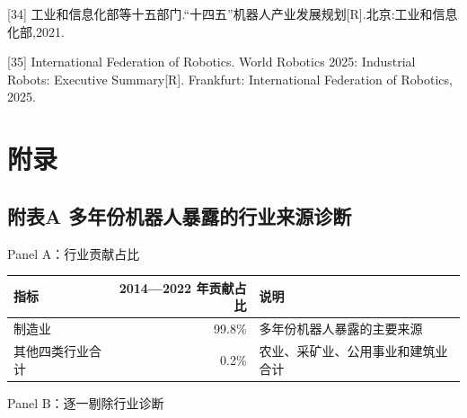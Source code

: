 \documentclass[UTF8, zihao=-4, a4paper, openany, fontset=none]{ctexrep}
\newcounter{none}
\numberwithin{equation}{chapter}
\begin{document}
{[}34{]} 工业和信息化部等十五部门.``十四五''机器人产业发展规划{[}R{]}.北京:工业和信息化部,2021.

{[}35{]} International Federation of Robotics. World Robotics 2025: Industrial Robots: Executive Summary{[}R{]}. Frankfurt: International Federation of Robotics, 2025.


\appendix
\chapter*{附录}
\section{附表A 多年份机器人暴露的行业来源诊断}\label{ux9644ux8868a-ux591aux5e74ux4efdux673aux5668ux4ebaux66b4ux9732ux7684ux884cux4e1aux6765ux6e90ux8bcaux65ad}

Panel A：行业贡献占比

{\def\LTcaptype{none} %
\begin{longtable}[]{@{}lrl@{}}
\toprule\noalign{}
指标 & 2014---2022 年贡献占比 & 说明 \\
\midrule\noalign{}
\endhead
\bottomrule\noalign{}
\endlastfoot
制造业 & 99.8\% & 多年份机器人暴露的主要来源 \\
其他四类行业合计 & 0.2\% & 农业、采矿业、公用事业和建筑业合计 \\
\end{longtable}
}

Panel B：逐一剔除行业诊断
\end{document}
